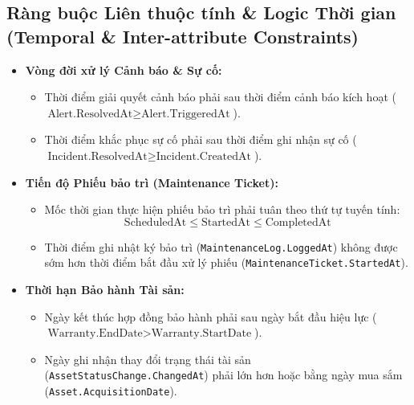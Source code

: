 \subsection{Ràng buộc Liên thuộc tính \& Logic Thời gian (Temporal \& Inter-attribute Constraints)}
\begin{itemize}[leftmargin=2em]
    \item \textbf{Vòng đời xử lý Cảnh báo \& Sự cố:}
    \begin{itemize}
        \item Thời điểm giải quyết cảnh báo phải sau thời điểm cảnh báo kích hoạt ($\text{Alert.ResolvedAt} \ge \text{Alert.TriggeredAt}$).
        \item Thời điểm khắc phục sự cố phải sau thời điểm ghi nhận sự cố ($\text{Incident.ResolvedAt} \ge \text{Incident.CreatedAt}$).
    \end{itemize}
    \item \textbf{Tiến độ Phiếu bảo trì (Maintenance Ticket):}
    \begin{itemize}
        \item Mốc thời gian thực hiện phiếu bảo trì phải tuân theo thứ tự tuyến tính: 
        \[
        \text{ScheduledAt} \le \text{StartedAt} \le \text{CompletedAt}
        \]
        \item Thời điểm ghi nhật ký bảo trì (\texttt{MaintenanceLog.LoggedAt}) không được sớm hơn thời điểm bắt đầu xử lý phiếu (\texttt{MaintenanceTicket.StartedAt}).
    \end{itemize}
    \item \textbf{Thời hạn Bảo hành Tài sản:}
    \begin{itemize}
        \item Ngày kết thúc hợp đồng bảo hành phải sau ngày bắt đầu hiệu lực ($\text{Warranty.EndDate} > \text{Warranty.StartDate}$).
        \item Ngày ghi nhận thay đổi trạng thái tài sản (\texttt{AssetStatusChange.ChangedAt}) phải lớn hơn hoặc bằng ngày mua sắm (\texttt{Asset.AcquisitionDate}).
    \end{itemize}
\end{itemize}

